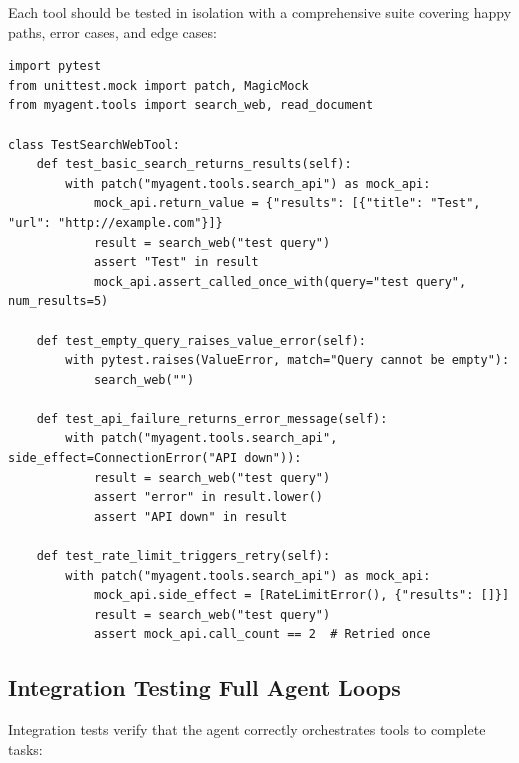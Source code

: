 Each tool should be tested in isolation with a comprehensive suite covering happy paths, error cases, and edge cases:

\begin{lstlisting}[style=pythonstyle, caption={Unit testing agent tools with pytest}]
import pytest
from unittest.mock import patch, MagicMock
from myagent.tools import search_web, read_document

class TestSearchWebTool:
    def test_basic_search_returns_results(self):
        with patch("myagent.tools.search_api") as mock_api:
            mock_api.return_value = {"results": [{"title": "Test", "url": "http://example.com"}]}
            result = search_web("test query")
            assert "Test" in result
            mock_api.assert_called_once_with(query="test query", num_results=5)

    def test_empty_query_raises_value_error(self):
        with pytest.raises(ValueError, match="Query cannot be empty"):
            search_web("")

    def test_api_failure_returns_error_message(self):
        with patch("myagent.tools.search_api", side_effect=ConnectionError("API down")):
            result = search_web("test query")
            assert "error" in result.lower()
            assert "API down" in result

    def test_rate_limit_triggers_retry(self):
        with patch("myagent.tools.search_api") as mock_api:
            mock_api.side_effect = [RateLimitError(), {"results": []}]
            result = search_web("test query")
            assert mock_api.call_count == 2  # Retried once
\end{lstlisting}

\subsection{Integration Testing Full Agent Loops}
\label{integration-testing-full-agent-loops}

Integration tests verify that the agent correctly orchestrates tools to complete tasks:

